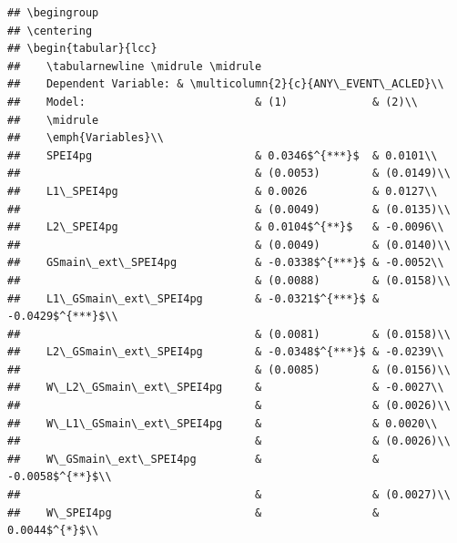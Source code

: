\documentclass[
  a4paper,
]{article}
\begin{document}
\begin{verbatim}
## \begingroup
## \centering
## \begin{tabular}{lcc}
##    \tabularnewline \midrule \midrule
##    Dependent Variable: & \multicolumn{2}{c}{ANY\_EVENT\_ACLED}\\
##    Model:                          & (1)             & (2)\\  
##    \midrule
##    \emph{Variables}\\
##    SPEI4pg                         & 0.0346$^{***}$  & 0.0101\\   
##                                    & (0.0053)        & (0.0149)\\   
##    L1\_SPEI4pg                     & 0.0026          & 0.0127\\   
##                                    & (0.0049)        & (0.0135)\\   
##    L2\_SPEI4pg                     & 0.0104$^{**}$   & -0.0096\\   
##                                    & (0.0049)        & (0.0140)\\   
##    GSmain\_ext\_SPEI4pg            & -0.0338$^{***}$ & -0.0052\\   
##                                    & (0.0088)        & (0.0158)\\   
##    L1\_GSmain\_ext\_SPEI4pg        & -0.0321$^{***}$ & -0.0429$^{***}$\\   
##                                    & (0.0081)        & (0.0158)\\   
##    L2\_GSmain\_ext\_SPEI4pg        & -0.0348$^{***}$ & -0.0239\\   
##                                    & (0.0085)        & (0.0156)\\   
##    W\_L2\_GSmain\_ext\_SPEI4pg     &                 & -0.0027\\   
##                                    &                 & (0.0026)\\   
##    W\_L1\_GSmain\_ext\_SPEI4pg     &                 & 0.0020\\   
##                                    &                 & (0.0026)\\   
##    W\_GSmain\_ext\_SPEI4pg         &                 & -0.0058$^{**}$\\   
##                                    &                 & (0.0027)\\   
##    W\_SPEI4pg                      &                 & 0.0044$^{*}$\\   

\end{verbatim}
\end{document}
